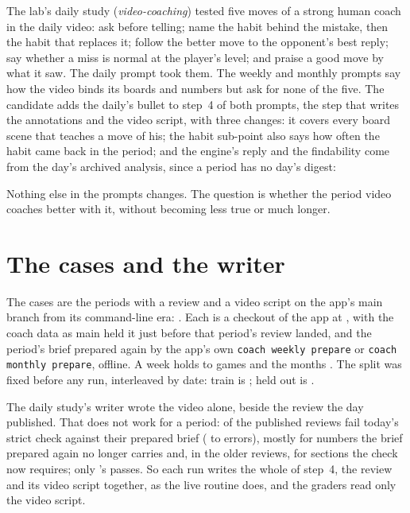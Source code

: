 \documentclass[11pt]{article}
\begin{document}
The lab's daily study (\emph{video-coaching}) tested five moves of a strong human coach in the daily
video: ask before telling; name the habit behind the mistake, then the habit that replaces it; follow
the better move to the opponent's best reply; say whether a miss is normal at the player's level; and
praise a good move by what it saw. The daily prompt took them. The weekly and monthly prompts say how
the video binds its boards and numbers but ask for none of the five. The candidate adds the daily's
bullet to step~4 of both prompts, the step that writes the annotations and the video script, with
three changes: it covers every board scene that teaches a move of his; the habit sub-point also says
how often the habit came back in the period; and the engine's reply and the findability come from the
day's archived analysis, since a period has no day's digest:

\CandidateBullet

Nothing else in the prompts changes. The question is whether the period video coaches better with
it, without becoming less true or much longer.

\section{The cases and the writer}

The cases are the \Cases{} periods with a review and a video script on the app's main branch from
its command-line era: \CaseSpan. Each is a checkout of the app at \texttt{\AppCommit}, with the
coach data as main held it just before that period's review landed, and the period's brief prepared
again by the app's own \texttt{coach weekly prepare} or \texttt{coach monthly prepare}, offline. A
week holds \WeekGamesMin{} to \WeekGamesMax{} games and the months \MonthGames. The split was fixed
before any run, interleaved by date: train is \TrainCases; held out is \HeldCases.

The daily study's writer wrote the video alone, beside the review the day published. That does not
work for a period: \RefFailedN{} of the \AllPeriods{} published reviews fail today's strict check
against their prepared brief (\RefErrorsMin{} to \RefErrorsMax{} errors), mostly for numbers the
brief prepared again no longer carries and, in the older reviews, for sections the check now
requires; only \RefPassed's passes. So each run writes the whole of step~4, the review and its video script
together, as the live routine does, and the graders read only the video script.
\end{document}
